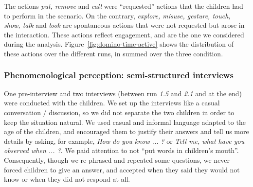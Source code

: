 \documentclass{sig-alternate}
\begin{document}
The actions \textit{put, remove} and \textit{call} were ``requested'' actions
that the children had to perform in the scenario. On the contrary,
\textit{explore, misuse, gesture, touch, show, talk} and \textit{look} are
spontaneous actions that were not requested but arose in the interaction.  These
actions reflect engagement, and are the one we considered during the analysis.
Figure~\ref{fig:domino-time-active} shows the distribution of these actions over
the different runs, in summed over the three condition.

\subsubsection{Phenomenological perception: semi-structured interviews}

One pre-interview and two interviews (between run \emph{1.5} and \emph{2.1} and
at the end) were conducted with the children.  We set up the interviews like a
casual conversation / discussion, so we did not separate the two children in
order to keep the situation natural. We used casual and informal language
adapted to the age of the children, and encouraged them to justify their answers
and tell us more details by asking, for example, \textit{How do you know ... ?}
or \textit{Tell me, what have you observed when ... ?}. We paid attention to not
``put words in children's mouth''. Consequently, though we re-phrased and
repeated some questions, we never forced children to give an answer, and
accepted when they said they would not know or when they did not respond at all.	
\end{document}
